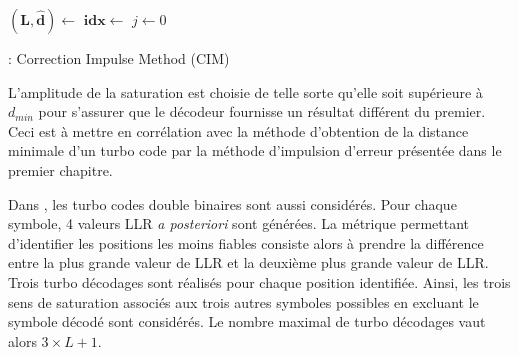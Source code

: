 \begin{center}
\begin{minipage}{.7\textwidth}%

		\begin{algorithm}[H]
		\DontPrintSemicolon

		$\mathbf{(L,\hat{d})} \gets$ \;
		$\mathbf{idx} \gets$ \;
		\;
		$j \gets 0$\;
	\caption{: Correction Impulse Method (CIM)}
	\label{alg:fsm}
	\end{algorithm}
\end{minipage}
\end{center}

L'amplitude de la saturation est choisie de telle sorte qu'elle soit supérieure à $d_{min}$ pour s'assurer que le décodeur 
fournisse un résultat différent du premier. Ceci est à mettre en corrélation avec la méthode d'obtention de la distance 
minimale d'un turbo code par la méthode d'impulsion d'erreur \cite{eim} présentée dans le premier chapitre.

Dans \cite{cim}, les turbo codes double binaires sont aussi considérés. Pour chaque symbole, 4 valeurs LLR \textit{a 
posteriori} sont générées. La métrique permettant d'identifier les positions les moins fiables consiste alors à prendre 
la différence entre la plus grande valeur de LLR et la deuxième plus grande valeur de LLR. Trois turbo décodages sont 
réalisés pour chaque position identifiée. Ainsi, les trois sens de saturation associés aux trois autres symboles possibles 
en excluant le symbole décodé sont considérés. Le nombre maximal de turbo décodages vaut alors $3\times L + 1$.

